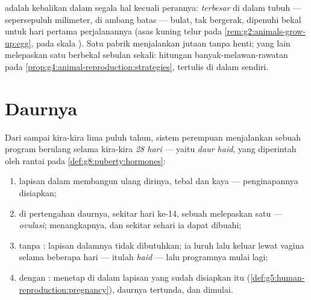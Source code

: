 \begin{example}\label{ex:g8:reproductive-systems:egg}
 adalah kebalikan  dalam segala hal
kecuali perannya:  \emph{terbesar} di dalam tubuh ---
sepersepuluh milimeter, di ambang batas  --- bulat, tak
bergerak, dipenuhi bekal untuk hari pertama perjalanannya
(asas kuning telur pada \cref{rem:g2:animals-grow-up:egg},
pada skala ). Satu pabrik menjalankan jutaan tanpa henti;
yang lain melepaskan satu  berbekal sebulan sekali:
hitungan banyak-melawan-rawatan pada
\cref{prop:g4:animal-reproduction:strategies}, tertulis di
dalam  sendiri.
\end{example}

\section{Daurnya}

\begin{proposition}\label{prop:g8:reproductive-systems:cycle}
Dari  sampai kira-kira lima puluh tahun, sistem
perempuan menjalankan sebuah program berulang selama
kira-kira \emph{28 hari} --- yaitu \emph{daur
haid}, yang diperintah oleh rantai 
pada \cref{def:g8:puberty:hormones}:
\begin{enumerate}
  \item lapisan dalam  membangun ulang dirinya,
        tebal dan kaya  --- penginapannya disiapkan;
  \item di pertengahan daurnya, sekitar hari ke-14, sebuah
         melepaskan satu  ---
        \emph{ovulasi}; 
        menangkapnya, dan sekitar sehari ia dapat dibuahi;
  \item tanpa : lapisan dalamnya tidak dibutuhkan;
        ia luruh lalu keluar lewat vagina selama beberapa
        hari --- itulah \emph{haid} --- lalu
        programnya mulai lagi;
  \item dengan :  menetap di dalam lapisan
        yang sudah disiapkan itu
        (\cref{def:g5:human-reproduction:pregnancy}),
        daurnya tertunda, dan  dimulai.
\end{enumerate}
\end{proposition}
\admitted

